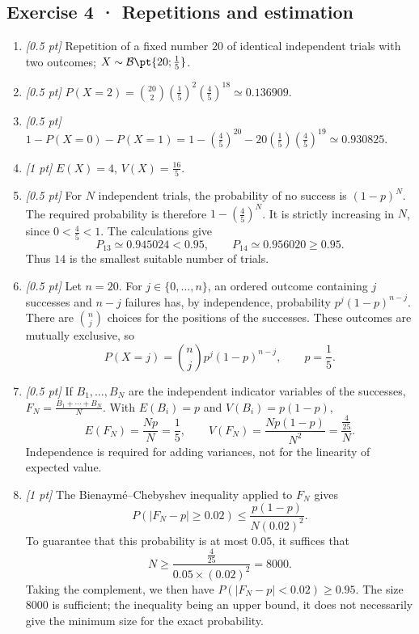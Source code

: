 \subsection*{Exercise 4 · Repetitions and estimation}\begin{enumerate}

\item \textit{[0.5 pt]} Repetition of a fixed number $20$ of identical independent trials with two outcomes; $X\sim\mathcal B\pt{20;\frac{1}{5}}$.

\item \textit{[0.5 pt]} $P(X=2)=\binom{20}2(\frac{1}{5})^2(\frac{4}{5})^{18}\simeq\num{0,136909}$.

\item \textit{[0.5 pt]} $1-P(X=0)-P(X=1)=1-(\frac{4}{5})^{20}-20(\frac{1}{5})(\frac{4}{5})^{19}\simeq\num{0,930825}$.

\item \textit{[1 pt]} $E(X)=4$, $V(X)=\frac{16}{5}$.

\item \textit{[0.5 pt]} For $N$ independent trials, the probability of no success is $(1-p)^N$. The required probability is therefore $1-(\frac{4}{5})^N$. It is strictly increasing in $N$, since $0<\frac{4}{5}<1$. The calculations give
\[P_{13}\simeq\num{0,945024}<\num{0,95},\qquad P_{14}\simeq\num{0,956020}\ge\num{0,95}.\]
Thus $14$ is the smallest suitable number of trials.

\item \textit{[0.5 pt]} Let $n=20$. For $j\in\{0,\ldots,n\}$, an ordered outcome containing $j$ successes and $n-j$ failures has, by independence, probability $p^j(1-p)^{n-j}$. There are $\binom nj$ choices for the positions of the successes. These outcomes are mutually exclusive, so
\[P(X=j)=\binom nj p^j(1-p)^{n-j},\qquad p=\frac{1}{5}.\]

\item \textit{[0.5 pt]} If $B_1,\ldots,B_N$ are the independent indicator variables of the successes, $F_N=\frac{B_1+\cdots+B_N}{N}$. With $E(B_i)=p$ and $V(B_i)=p(1-p)$,
\[E(F_N)=\frac{Np}{N}=\frac{1}{5},\qquad V(F_N)=\frac{Np(1-p)}{N^2}=\frac{\frac{4}{25}}{N}.\]
Independence is required for adding variances, not for the linearity of expected value.

\item \textit{[1 pt]} The Bienaymé–Chebyshev inequality applied to $F_N$ gives
\[P(|F_N-p|\ge\num{0,02})\le\frac{p(1-p)}{N(\num{0,02})^2}.\]
To guarantee that this probability is at most $\num{0,05}$, it suffices that
\[N\ge\frac{\frac{4}{25}}{\num{0,05}\times(\num{0,02})^2}=8000.\]
Taking the complement, we then have $P(|F_N-p|<\num{0,02})\ge\num{0,95}$. The size $8000$ is sufficient; the inequality being an upper bound, it does not necessarily give the minimum size for the exact probability.

\end{enumerate}

